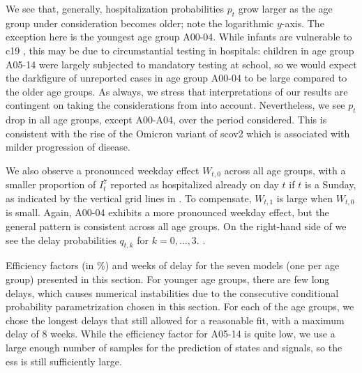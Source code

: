 We see that, generally, hospitalization probabilities $p_{t}$ grow larger as the age group under consideration becomes older; note the logarithmic $y$-axis. The exception here is the youngest age group A00-04. While infants are vulnerable to \acrshort{c19} \citep{Havers2024COVID19Associateda}, this may be due to circumstantial testing in hospitals: children in age group A05-14 were largely  subjected to mandatory testing at school, so we would expect the darkfigure of unreported cases in age group A00-04 to be large compared to the older age groups. As always, we stress that interpretations of our results are contingent on taking the considerations from  into account. 
Nevertheless, we see $p_{t}$ drop in all age groups, except A00-A04, over the period considered. This is consistent with the rise of the Omicron variant of \acrshort{scov2} \citep{RobertKoch-Institut2024SARSCoV2b} which is associated with milder progression of disease. 

We also observe a pronounced weekday effect $W_{t,0}$ across all age groups, with a smaller proportion of $I^{7}_{t}$ reported as hospitalized already on day $t$ if $t$ is a Sunday, as indicated by the vertical grid lines in . To compensate, $W_{t,1}$ is large when $W_{t,0}$ is small. Again, A00-04 exhibits a more pronounced weekday effect, but the general pattern is consistent across all age groups. 
On the right-hand side of  we see the delay probabilities $q_{t,k}$ for $k=0, \dots, 3$. .

\begin{table}
    \centering
    
    \caption{Efficiency factors (in \%) and weeks of delay for the seven models (one per age group) presented in this section. For younger age groups, there are few long delays, which causes numerical instabilities due to the consecutive conditional probability parametrization chosen in this section. For each of the age groups, we chose the longest delays that still allowed for a reasonable fit, with a maximum delay of $8$ weeks. While the efficiency factor for A05-14 is quite low, we use a large enough number of samples for the prediction of states and signals, so the \acrshort{ess} is still sufficiently large.}
    \label{tab:hospitalization_showcase_ess}
\end{table}





